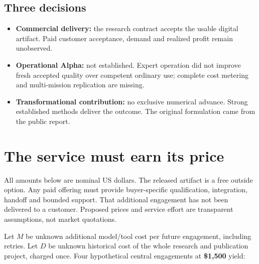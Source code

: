 \documentclass[
  10pt,
]{article}
\providecommand{\tightlist}{%
  \setlength{\itemsep}{0pt}\setlength{\parskip}{0pt}}
\begin{document}
\hypertarget{three-decisions}{%
\subsection{Three decisions}\label{three-decisions}}

\begin{itemize}
\tightlist
\item
  \textbf{Commercial delivery:} the research contract accepts the usable
  digital artifact. Paid customer acceptance, demand and realized profit
  remain unobserved.
\item
  \textbf{Operational Alpha:} not established. Expert operation did not
  improve fresh accepted quality over competent ordinary use; complete
  cost metering and multi-mission replication are missing.
\item
  \textbf{Transformational contribution:} no exclusive numerical
  advance. Strong established methods deliver the outcome. The original
  formulation came from the public report.
\end{itemize}

\clearpage

\hypertarget{the-service-must-earn-its-price}{%
\section{The service must earn its
price}\label{the-service-must-earn-its-price}}

All amounts below are nominal US dollars. The released artifact is a
free outside option. Any paid offering must provide buyer-specific
qualification, integration, handoff and bounded support. That additional
engagement has not been delivered to a customer. Proposed prices and
service effort are transparent assumptions, not market quotations.

Let \(M\) be unknown additional model/tool cost per future engagement,
including retries. Let \(D\) be unknown historical cost of the whole
research and publication project, charged once. Four hypothetical
central engagements at \textbf{\$1,500} yield:
\end{document}
